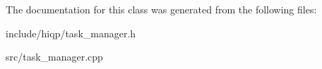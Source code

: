 The documentation for this class was generated from the following files\-:\begin{DoxyCompactItemize}
\item 
include/hiqp/task\-\_\-manager.\-h\item 
src/task\-\_\-manager.\-cpp\end{DoxyCompactItemize}
